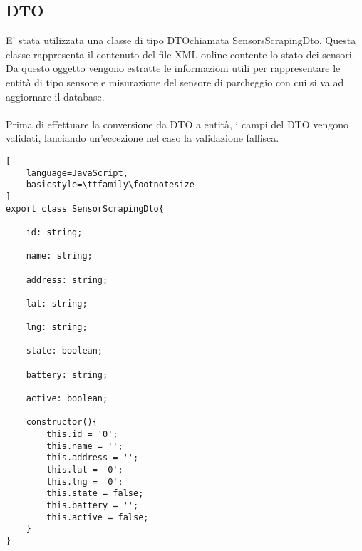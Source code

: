 \subsection{DTO}
E' stata utilizzata una classe di tipo \gls{DTO}\glsfirstoccur chiamata SensorsScrapingDto. Questa classe rappresenta
il contenuto del file \gls{XML} online contente lo stato dei sensori. Da questo oggetto vengono estratte le informazioni
utili per rappresentare le entità di tipo sensore e misurazione del sensore di parcheggio con cui si va ad aggiornare il database.
\\\\
Prima di effettuare la conversione da \gls{DTO} a entità, i campi del \gls{DTO} vengono validati, lanciando un'eccezione nel caso 
la validazione fallisca.
\\
\begin{lstlisting}[
    language=JavaScript,
    basicstyle=\ttfamily\footnotesize
]
export class SensorScrapingDto{
    
    id: string;

    name: string;

    address: string;

    lat: string;

    lng: string;

    state: boolean;

    battery: string;

    active: boolean;

    constructor(){
        this.id = '0';
        this.name = '';
        this.address = '';
        this.lat = '0';
        this.lng = '0';
        this.state = false;
        this.battery = '';
        this.active = false;
    }
}
\end{lstlisting}
